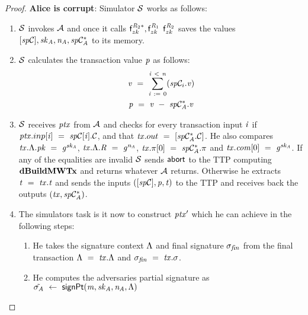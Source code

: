 \begin{proof}
    \textbf{Alice is corrupt}: Simulator $\mathcal{S}$ works as follows:
    \begin{enumerate}
        \item $\mathcal{S}$ invokes $\mathcal{A}$ and once it calls $\mathsf{f}^{\mathit{R}_2*}_{zk}, \mathsf{f}^{\mathit{R}_1}_{zk}$ $\mathsf{f}^{\mathit{R}_2}_{zk}$ saves the values $[\mathit{sp}\mathcal{C}], \mathit{sk}_{\mathit{A}}, \mathit{\mathit{n}_{\mathit{A}}}, \mathit{sp}\mathcal{C}_{\mathit{A}}^*$ to its memory.
        \item $\mathcal{S}$ calculates the transaction value $\mathit{p}$ as follows:
        \begin{gather*}
            \mathit{v} ~=~ \sum_{\mathit{i} ~:=~ 0}^{\mathit{i} ~<~ \mathit{n}}(\mathit{sp}\mathcal{C}_i.\mathit{v}) \\
            \mathit{p} ~=~ \mathit{v} ~-~ \mathit{sp}\mathcal{C}_{\mathit{A}}^*.\mathit{v}
        \end{gather*}
        \item $\mathcal{S}$ receives $\mathit{ptx}$ from $\mathcal{A}$ and checks for every transaction input $\mathit{i}$ if $\mathit{ptx}.inp[\mathit{i}] ~=~ \mathit{sp}\mathcal{C}[\mathit{i}].\mathcal{C}$, and that $\mathit{tx}.out ~=~ [\mathit{sp}\mathcal{C}_{\mathit{A}}^*.\mathcal{C}]$.
        He also compares $\mathit{tx}.\Lambda.\mathit{pk} ~=~ \mathit{g}^{\mathit{sk}_{\mathit{A}}}$, $\mathit{tx}.\Lambda.\mathit{R} ~=~ \mathit{g}^{\mathit{\mathit{n}_{\mathit{A}}}}$, $\mathit{tx}.\pi[0] ~=~ \mathit{sp}\mathcal{C}_{\mathit{A}}^*.\pi$ and $\mathit{tx}.\mathit{com}[0] ~=~ \mathit{g}^{\mathit{sk}_{\mathit{A}}}$.
        If any of the equalities are invalid $\mathcal{S}$ sends $\mathsf{abort}$ to the TTP computing $\mathbf{dBuildMWTx}$ and returns whatever $\mathcal{A}$ returns.
        Otherwise he extracts $\mathit{t} ~=~ \mathit{tx}.\mathit{t}$ and sends the inputs $([\mathit{sp}\mathcal{C}], \mathit{p}, \mathit{t})$ to the TTP and receives back the outputs $(\mathit{tx}, \mathit{sp}\mathcal{C}_{\mathit{A}}^*)$.
        \item The simulators task is it now to construct ${\mathit{ptx}}'$ which he can achieve in the following steps:
        \begin{enumerate}
            \item He takes the signature context $\Lambda$ and final signature $\sigma_{\mathit{fin}}$ from the final transaction $\Lambda ~=~ \mathit{tx}.\Lambda$ and $\sigma_{\mathit{fin}} ~=~ \mathit{tx}.\sigma$.
            \item He computes the adversaries partial signature as $\tilde{\sigma_{\mathit{A}}} ~\leftarrow~ \mathsf{signPt}(\mathit{m}, \mathit{sk}_{\mathit{A}}, \mathit{\mathit{n}_{\mathit{A}}}, \Lambda)$

\end{enumerate}
\end{enumerate}
\end{proof}
